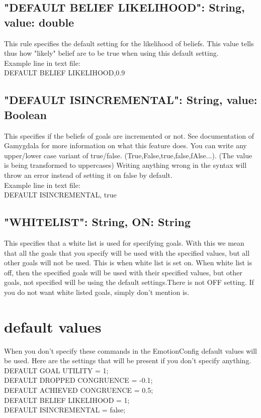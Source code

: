 \documentclass{scrartcl}
\begin{document}
\subsection*{"DEFAULT BELIEF LIKELIHOOD": String, value: double}
This rule specifies the default setting for the likelihood of beliefs. This value tells thus how "likely" belief are to be true when using this default setting.\\
Example line in text file:\\
DEFAULT BELIEF LIKELIHOOD,0.9\\

\subsection*{"DEFAULT ISINCREMENTAL": String, value: Boolean}
This specifies if the beliefs of goals are incremented or not. See documentation of Gamygdala for more information on what this feature does.
You can write any upper/lower case variant of true/false. (True,False,true,false,fAlse...). (The value is being transformed to uppercases)
Writing anything wrong in the syntax will throw an error instead of setting it on false by default.\\
Example line in text file:\\
DEFAULT ISINCREMENTAL, true\\
\pagebreak
\subsection*{"WHITELIST": String, ON: String}
This specifies that a white list is used for specifying goals. With this we mean that all the goals that you specify will be used with the specified values, but all other goals will not be used. This is when white list is set on. When white list is off, then the specified goals will be used with their specified values, but other goals, not specified will be using the default settings.There is not OFF setting. If you do not want  white listed goals, simply don't mention is.

\section*{default values}
When you don't specify these commands in the EmotionConfig default values will be used. Here are the settings that will be present if you don't specify anything.\\
DEFAULT GOAL UTILITY = 1;\\
DEFAULT DROPPED CONGRUENCE = -0.1;\\
DEFAULT ACHIEVED CONGRUENCE = 0.5;\\
DEFAULT BELIEF LIKELIHOOD = 1;\\
DEFAULT ISINCREMENTAL = false;\\
\end{document}
